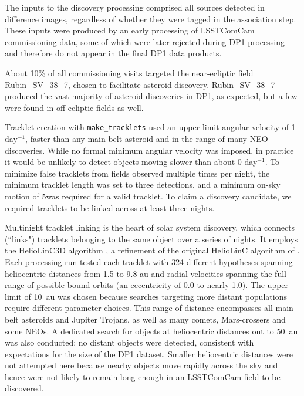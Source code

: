 The inputs to the discovery processing comprised all sources detected in difference images, regardless of whether they were tagged in the association step.
These inputs were produced by an early processing of \gls{LSSTComCam} commissioning data, some of which were later rejected during \gls{DP1} processing and therefore do not appear in the final \gls{DP1} data products.

About 10\% of all commissioning visits targeted the near-ecliptic field Rubin\_SV\_38\_7, chosen to facilitate asteroid discovery.
Rubin\_SV\_38\_7 produced the vast majority of asteroid discoveries in \gls{DP1}, as expected, but a few were found in off-ecliptic fields as well.

Tracklet creation with \texttt{make\_tracklets} used an upper limit angular velocity of 1 day$^{-1}$, faster than any main belt asteroid and in the range of many \gls{NEO} discoveries.
While no formal minimum angular velocity was imposed, in practice it would be unlikely to detect objects moving slower  than about 0 day$^{-1}$.
To minimize false \gls{tracklet}s from fields observed multiple times per night, the minimum \gls{tracklet} length was set to three detections, and a minimum on-sky motion of 5\farcs was required for a valid \gls{tracklet}.
To claim a discovery candidate, we required tracklets to be linked across at least three nights.

Multinight \gls{tracklet} linking is the heart of solar system discovery,  which connects (``links") tracklets belonging to the same object over a series of nights.
It employs the HelioLinC3D algorithm \citep[][]{2020DPS....5221101E,2022DPS....5450404H}, a refinement of the original HelioLinC algorithm of \citet{2018AJ....156..135H}.
Each processing run tested each \gls{tracklet} with 324 different hypotheses spanning heliocentric distances from 1.5 to 9.8 \gls{au} and radial velocities spanning the full range of possible bound orbits (an eccentricity of 0.0 to nearly 1.0).
The upper limit of 10~\gls{au} was chosen because searches targeting more distant populations require different parameter choices.
This range of distance encompasses all main belt asteroids and Jupiter Trojans, as well as many comets, Mars-crossers and some \glspl{NEO}.
A dedicated search for objects at heliocentric distances out to 50~\gls{au} was also conducted; no distant objects were detected, consistent with expectations for the size of the \gls{DP1} dataset.
Smaller heliocentric distances were not attempted here because nearby objects move rapidly across the sky and hence were not likely to remain long enough in an \gls{LSSTComCam} field to be discovered.

